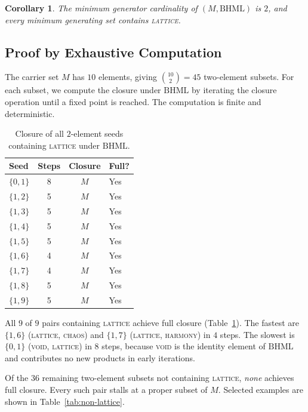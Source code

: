 \documentclass[11pt,a4paper]{article}
\newtheorem{corollary}[theorem]{Corollary}
\theoremstyle{definition}
\theoremstyle{remark}
\newcommand{\BHML}{\mathrm{BHML}}
\begin{document}
\begin{corollary}\label{cor:min-gen}
The minimum generator cardinality of $(M,\BHML)$ is $2$, and every minimum generating set contains \textsc{lattice}.
\end{corollary}

\subsection{Proof by Exhaustive Computation}\label{sec:proof}

The carrier set $M$ has $10$ elements, giving $\binom{10}{2}=45$ two-element subsets. For each subset, we compute the closure under $\BHML$ by iterating the closure operation until a fixed point is reached. The computation is finite and deterministic.

\begin{table}[ht]
\centering
\caption{Closure of all $2$-element seeds containing \textsc{lattice} under $\BHML$.}\label{tab:lattice-seeds}
\begin{tabular}{lccl}
\toprule
Seed & Steps & Closure & Full? \\
\midrule
$\{0,1\}$ & 8 & $M$ & Yes \\
$\{1,2\}$ & 5 & $M$ & Yes \\
$\{1,3\}$ & 5 & $M$ & Yes \\
$\{1,4\}$ & 5 & $M$ & Yes \\
$\{1,5\}$ & 5 & $M$ & Yes \\
$\{1,6\}$ & 4 & $M$ & Yes \\
$\{1,7\}$ & 4 & $M$ & Yes \\
$\{1,8\}$ & 5 & $M$ & Yes \\
$\{1,9\}$ & 5 & $M$ & Yes \\
\bottomrule
\end{tabular}
\end{table}

All $9$ of $9$ pairs containing \textsc{lattice} achieve full closure (Table~\ref{tab:lattice-seeds}). The fastest are $\{1,6\}$ (\textsc{lattice}, \textsc{chaos}) and $\{1,7\}$ (\textsc{lattice}, \textsc{harmony}) in $4$ steps. The slowest is $\{0,1\}$ (\textsc{void}, \textsc{lattice}) in $8$ steps, because \textsc{void} is the identity element of $\BHML$ and contributes no new products in early iterations.

Of the $36$ remaining two-element subsets not containing \textsc{lattice}, \emph{none} achieves full closure. Every such pair stalls at a proper subset of $M$. Selected examples are shown in Table~\ref{tab:non-lattice}.
\end{document}
